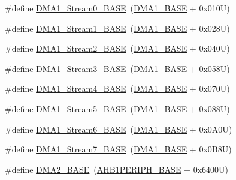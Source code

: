 \begin{DoxyCompactItemize}
\item 
\#define \hyperlink{group___peripheral__memory__map_ga0d3c52aa35dcc68f78b704dfde57ba95}{D\+M\+A1\+\_\+\+Stream0\+\_\+\+B\+A\+SE}~(\hyperlink{group___peripheral__memory__map_gab2d8a917a0e4ea99a22ac6ebf279bc72}{D\+M\+A1\+\_\+\+B\+A\+SE} + 0x010\+U)
\item 
\#define \hyperlink{group___peripheral__memory__map_ga5b4152cef577e37eccc9311d8bdbf3c2}{D\+M\+A1\+\_\+\+Stream1\+\_\+\+B\+A\+SE}~(\hyperlink{group___peripheral__memory__map_gab2d8a917a0e4ea99a22ac6ebf279bc72}{D\+M\+A1\+\_\+\+B\+A\+SE} + 0x028\+U)
\item 
\#define \hyperlink{group___peripheral__memory__map_ga48a551ee91d3f07dd74347fdb35c703d}{D\+M\+A1\+\_\+\+Stream2\+\_\+\+B\+A\+SE}~(\hyperlink{group___peripheral__memory__map_gab2d8a917a0e4ea99a22ac6ebf279bc72}{D\+M\+A1\+\_\+\+B\+A\+SE} + 0x040\+U)
\item 
\#define \hyperlink{group___peripheral__memory__map_gac51deb54ff7cfe1290dfcf517ae67127}{D\+M\+A1\+\_\+\+Stream3\+\_\+\+B\+A\+SE}~(\hyperlink{group___peripheral__memory__map_gab2d8a917a0e4ea99a22ac6ebf279bc72}{D\+M\+A1\+\_\+\+B\+A\+SE} + 0x058\+U)
\item 
\#define \hyperlink{group___peripheral__memory__map_ga757a3c0d866c0fe68c6176156065a26b}{D\+M\+A1\+\_\+\+Stream4\+\_\+\+B\+A\+SE}~(\hyperlink{group___peripheral__memory__map_gab2d8a917a0e4ea99a22ac6ebf279bc72}{D\+M\+A1\+\_\+\+B\+A\+SE} + 0x070\+U)
\item 
\#define \hyperlink{group___peripheral__memory__map_ga0ded7bed8969fe2e2d616e7f90eb7654}{D\+M\+A1\+\_\+\+Stream5\+\_\+\+B\+A\+SE}~(\hyperlink{group___peripheral__memory__map_gab2d8a917a0e4ea99a22ac6ebf279bc72}{D\+M\+A1\+\_\+\+B\+A\+SE} + 0x088\+U)
\item 
\#define \hyperlink{group___peripheral__memory__map_ga58998ddc40adb6361704d6c9dad08125}{D\+M\+A1\+\_\+\+Stream6\+\_\+\+B\+A\+SE}~(\hyperlink{group___peripheral__memory__map_gab2d8a917a0e4ea99a22ac6ebf279bc72}{D\+M\+A1\+\_\+\+B\+A\+SE} + 0x0\+A0\+U)
\item 
\#define \hyperlink{group___peripheral__memory__map_ga82186dd6d3f60995d428b34c041919d7}{D\+M\+A1\+\_\+\+Stream7\+\_\+\+B\+A\+SE}~(\hyperlink{group___peripheral__memory__map_gab2d8a917a0e4ea99a22ac6ebf279bc72}{D\+M\+A1\+\_\+\+B\+A\+SE} + 0x0\+B8\+U)
\item 
\#define \hyperlink{group___peripheral__memory__map_gab72a9ae145053ee13d1d491fb5c1df64}{D\+M\+A2\+\_\+\+B\+A\+SE}~(\hyperlink{group___peripheral__memory__map_ga811a9a4ca17f0a50354a9169541d56c4}{A\+H\+B1\+P\+E\+R\+I\+P\+H\+\_\+\+B\+A\+SE} + 0x6400\+U)

\end{DoxyCompactItemize}
